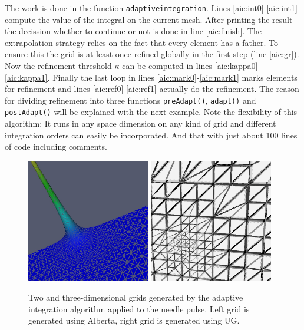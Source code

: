 \documentclass[11pt,a4paper,headinclude,footinclude,DIV16,normalheadings]{scrreprt}
\begin{document}
The work is done in the function \lstinline!adaptiveintegration!.
Lines \ref{aic:int0}-\ref{aic:int1} compute the value of the integral
on the current mesh. After printing the result the decission whether
to continue or not is done in line \ref{aic:finish}. The extrapolation
strategy relies on the fact that every element has a father. To ensure
this the grid is at least once refined globally in the first step
(line \ref{aic:gr}). Now the refinement threshold $\kappa$ can be
computed in lines \ref{aic:kappa0}-\ref{aic:kappa1}. Finally the last
loop in lines \ref{aic:mark0}-\ref{aic:mark1} marks elements for
refinement and lines \ref{aic:ref0}-\ref{aic:ref1} actually do the
refinement. The reason for dividing refinement into three functions
\lstinline!preAdapt()!, \lstinline!adapt()! and
\lstinline!postAdapt()! will be explained with the next example. Note
the flexibility of this algorithm: It runs in any space dimension on
any kind of grid and different integration orders can easily be
incorporated. And that with just about 100 lines of code including
comments.

\begin{figure}
\includegraphics[width=0.48\textwidth]{EPS/adaptiveintegration_alberta2d}\hfill
\includegraphics[width=0.48\textwidth]{EPS/adaptiveintegration_ug3d}
\label{Fig:AdaptiveIntegration}
\caption{Two and three-dimensional grids generated by the adaptive
  integration algorithm applied to the needle pulse. Left grid is
  generated using Alberta, right grid is generated using UG.}
\end{figure}
\end{document}
